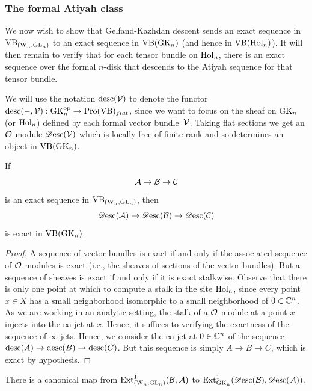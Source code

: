 \documentclass[10pt]{amsart}
\begin{document}
\subsubsection{The formal Atiyah class}

We now wish to show that Gelfand-Kazhdan descent sends an exact sequence in ${\rm VB}_{({{\rm W}_n}, {\rm GL}_n)}$ to an exact sequence in ${\rm VB}({\rm GK}_n)$ (and hence in ${\rm VB}({\rm Hol}_n)$). 
It will then remain to verify that for each tensor bundle on ${\rm Hol}_n$, 
there is an exact sequence over the formal $n$-disk that descends to the Atiyah sequence for that tensor bundle.

We will use the notation ${\rm desc}(\mathcal{V})$ to denote the functor ${\rm desc}(-,\mathcal{V}): {\rm GK}_n^{{\rm op}} \to {\rm Pro}({\rm VB})_{flat}$, 
since we want to focus on the sheaf on ${\rm GK}_n$ (or ${\rm Hol}_n$) defined
by each formal vector bundle~$\mathcal{V}$. Taking flat sections we get an
$\mathcal O$-module $\mathscr{D}{\rm esc}(\mathcal{V})$ which is locally free of finite
rank and so determines an object in ${\rm VB}({\rm GK}_n)$. 

\begin{lem}
If $$\mathcal A \to \mathcal B \to \mathcal C$$ is an exact sequence in ${\rm VB}_{({{\rm W}_n}, {\rm GL}_n)}$, then 
$$\mathscr{D}{\rm esc}(\mathcal A) \to \mathscr{D}{\rm esc}(\mathcal B) \to \mathscr{D}{\rm esc}(\mathcal C)$$ 
is exact in ${\rm VB}({\rm GK}_n)$.
\end{lem}

\begin{proof}
A sequence of vector bundles is exact if and only if the associated
sequence of $\mathcal O$-modules is exact (i.e., the sheaves of sections of
the vector bundles). But a sequence of sheaves is exact if and only if
it is exact stalkwise. Observe that there is only one point at which
to compute a stalk in the site ${\rm Hol}_n$, since every point $x \in X$
has a small neighborhood isomorphic to a small neighborhood of $0 \in
\mathbb C^n$. As we are working in an analytic setting, the stalk of a
$\mathcal O$-module at a point $x$ injects into the $\infty$-jet at
$x$. Hence, it suffices to verifying the exactness of the sequence of
$\infty$-jets. Hence, we consider the $\infty$-jet at $0 \in \mathbb C^n$ of
the sequence ${\rm desc}(A) \to {\rm desc}(B) \to {\rm desc}(C)$. But
this sequence is simply $A \to B \to C$, which is exact by
hypothesis.
\end{proof}

\begin{cor}
There is a canonical map from ${\rm Ext}^1_{({{\rm W}_n}, {\rm GL}_n)}(\mathcal B,\mathcal A)$ to ${\rm Ext}^1_{{\rm GK}_n}(\mathscr{D}{\rm esc}(\mathcal B), \mathscr{D}{\rm esc}(\mathcal A))$.
\end{cor}
\end{document}
